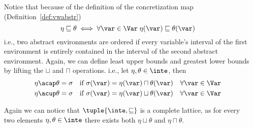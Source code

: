 Notice that because of the definition of the concretization map
(Definition~\ref{def:vwabstr})
\begin{equation*}
  \eta \sqsubseteq \theta \iff \forall \var \in \Var \; \eta(\var) \sqsubseteq \theta(\var)
\end{equation*}
i.e., two abstract environments are ordered if every variable's
interval of the first environment is entirely contained in the
interval of the second abstract environment.   Again, we can define least upper bounds and greatest lower
bounds by lifting the \(\sqcup\) and \(\sqcap\) operations. i.e., let
\(\eta, \theta \in \inte\), then
\begin{align*}
  \eta \acap \theta = \sigma & \quad \text{if } \sigma(\var) = \eta(\var) \sqcap \theta(\var) \quad \forall \var\in\Var \\
  \eta \acup \theta = \sigma & \quad \text{if } \sigma(\var) = \eta(\var) \sqcup \theta(\var) \quad \forall \var\in\Var \\
\end{align*}

Again we can notice that \(\tuple{\inte, \sqsubseteq}\) is a complete
lattice, as for every two elements \(\eta,\theta\in\inte\) there
exists both \(\eta \sqcup \theta\) and \(\eta \sqcap \theta\).
